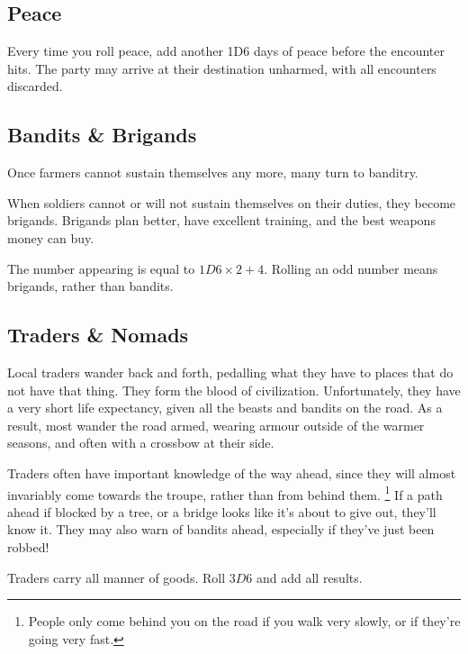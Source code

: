\begin{multicols}{2}

\subsection{Peace}

Every time you roll peace, add another 1D6 days of peace before the encounter hits.
The party may arrive at their destination unharmed, with all encounters discarded.

\encPeace

\subsection{Bandits \& Brigands}

Once farmers cannot sustain themselves any more, many turn to banditry.

When soldiers cannot or will not sustain themselves on their duties, they become brigands.
Brigands plan better, have excellent training, and the best weapons money can buy.

The number appearing is equal to $1D6\times 2 + 4$.
Rolling an odd number means brigands, rather than bandits.


\encBandits

\subsection{Traders \& Nomads}

Local traders wander back and forth, pedalling what they have to places that do not have that thing.
They form the blood of civilization.
Unfortunately, they have a very short life expectancy, given all the beasts and bandits on the road.
As a result, most wander the road armed, wearing armour outside of the warmer seasons, and often with a crossbow at their side.

Traders often have important knowledge of the way ahead, since they will almost invariably come towards the troupe, rather than from behind them.%
\footnote{People only come behind you on the road if you walk very slowly, or if they're going very fast.}
If a path ahead if blocked by a tree, or a bridge looks like it's about to give out, they'll know it.
They may also warn of bandits ahead, especially if they've just been robbed!

Traders carry all manner of goods.
Roll $3D6$ and add all results.

\encTraders


\end{multicols}
